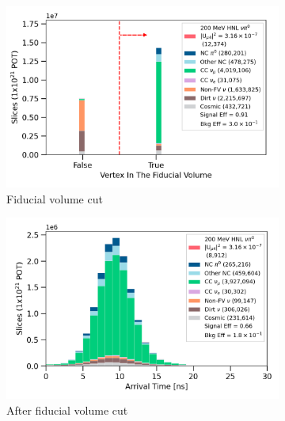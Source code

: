 \begin{figure}[htb]
        \begin{subfigure}[b]{0.495\textwidth}   
            \centering 
            \includegraphics[width=\textwidth]{fv_precut}
            \caption{Fiducial volume cut}%
            \label{fig:fv_cut}
        \end{subfigure}
        \hfill
        \begin{subfigure}[b]{0.495\textwidth}   
            \centering 
            \includegraphics[width=\textwidth]{beam_bucket_post_fv}
            \caption{After fiducial volume cut}%
            \label{fig:bb_post_fv}
        \end{subfigure}
        \hfill
        \begin{subfigure}[b]{0.495\textwidth}   
            \centering 

\end{subfigure}
\end{figure}
